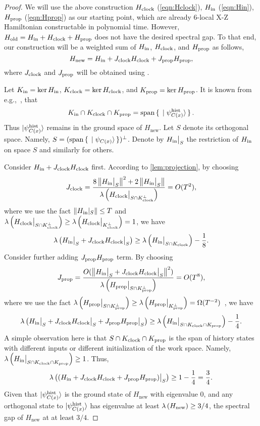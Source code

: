 \begin{proof}
We will use the above construction $H_{\mathrm{clock}}$ (\cref{eqn:Hclock}), $H_{\mathrm{in}}$ (\cref{eqn:Hin}), $H_{\mathrm{prop}}$ (\cref{eqn:Hprop}) as our starting point, which are already 6-local X-Z Hamiltonian constructable in polynomial time. However, $H_{\mathrm{old}}=H_{\mathrm{in}} + H_{\mathrm{clock}} + H_{\mathrm{prop}}$ does not have the desired spectral gap. To that end, our construction will be a weighted sum of $H_{\mathrm{in}}$, $H_{\mathrm{clock}}$, and $H_{\mathrm{prop}}$ as follows, 
\begin{equation}
    H_{\mathrm{new}}= H_{\mathrm{in}} + J_{\mathrm{clock}} H_{\mathrm{clock}} + J_{\mathrm{prop}} H_{\mathrm{prop}},
\end{equation}
where $J_{\mathrm{clock}}$ and $J_{\mathrm{prop}}$ will be obtained using . 

Let $K_{\mathrm{in}}=\ker H_{\mathrm{in}}$, $K_{\mathrm{clock}}=\ker H_{\mathrm{clock}}$, and $K_{\mathrm{prop}}=\ker H_{\mathrm{prop}}$. It is known from e.g.,~\cite{kitaev2002classical}, that 
\[
   K_{\mathrm{in}} \cap K_{\mathrm{clock}} \cap K_{\mathrm{prop}} = \operatorname*{\operatorname{span}}\set{\ket{\psi_{C(x)}^{\mathrm{hist}}}}.
\]
Thus $\ket{\psi_{C(x)}^{\mathrm{hist}}}$ remains in the ground space of $H_{\mathrm{new}}$. Let $S$ denote its orthogonal space. Namely, $S=(\operatorname*{\operatorname{span}}\set{\ket{\psi_{C(x)}}})^\bot$. 
Denote by $H_{\mathrm{in}}\big|_S$ the restriction of $H_{\mathrm{in}}$ on space $S$ and similarly for others. 

Consider $H_{\mathrm{in}} + J_{\mathrm{clock}}H_{\mathrm{clock}}$ first. According to \cref{lem:projection}, by choosing 
\[
  J_{\mathrm{clock}} = \frac{8\left\lVert H_{\mathrm{in}}\big|_S\right\rVert^2 + 2 \left\lVert H_{\mathrm{in}}\big|_S\right\rVert}{{\lambda \left (H_{\mathrm{clock}}\big|_{S\cap K_{\mathrm{clock}}^\bot} \right)}} = O(T^2),
\]
where we use the fact $\left\lVert H_{\mathrm{in}}|_S\right\rVert\leq T$ and ${\lambda \left (H_{\mathrm{clock}}\big|_{S\cap K_{\mathrm{clock}}^\bot} \right)}\geq {\lambda \left (H_{\mathrm{clock}}\big|_{K_{\mathrm{clock}}^\bot} \right)}=1$, 
we have 
\[
 {\lambda \left (H_{\mathrm{in}}\big|_S + J_{\mathrm{clock}}H_{\mathrm{clock}}\big|_S \right)}\geq {\lambda \left (H_{\mathrm{in}}\big|_{S\cap K_{\mathrm{clock}}} \right)} - \frac{1}{8}. 
\]
Consider further adding $J_{\mathrm{prop}}H_{\mathrm{prop}}$ term.  By choosing 
\[
 J_{\mathrm{prop}}= \frac{O(\left\lVert H_{\mathrm{in}}\big|_S + J_{\mathrm{clock}}H_{\mathrm{clock}}\big|_S\right\rVert^2)}{{\lambda \left (H_{\mathrm{prop}}\big|_{S \cap K_{\mathrm{prop}}^\bot} \right)}}= O(T^8),
\]
where we use the fact ${\lambda \left (H_{\mathrm{prop}}\big|_{S\cap K_{\mathrm{prop}}^\bot} \right)}\geq {\lambda \left (H_{\mathrm{prop}}\big|_{K_{\mathrm{prop}}^\bot} \right)}=\Omega(T^{-2})$~\cite{kitaev2002classical}, we have  
\[
 {\lambda \left (H_{\mathrm{in}}\big|_S + J_{\mathrm{clock}}H_{\mathrm{clock}}\big|_S + J_{\mathrm{prop}}H_{\mathrm{prop}}\big|_S \right)} \geq {\lambda \left (H_{\mathrm{in}}\big|_{S \cap K_{\mathrm{clock}}\cap K_{\mathrm{prop}}} \right)} - \frac{1}{4}. 
\]
A simple observation here is that $S \cap K_{\mathrm{clock}} \cap K_{\mathrm{prop}}$ is the span of history states with different inputs or different initialization of the work space. Namely, ${\lambda \left (H_{\mathrm{in}}\big|_{S \cap K_{\mathrm{clock}} \cap K_{\mathrm{prop}}} \right)} \geq 1$. Thus, 
\[
  {\lambda \left ((H_{\mathrm{in}} + J_{\mathrm{clock}}H_{\mathrm{clock}} + J_{\mathrm{prop}}H_{\mathrm{prop}})\big|_S \right)} \geq 1- \frac{1}{4}=\frac{3}{4}. 
\]
Given that $\ket{\psi_{C(x)}^{\mathrm{hist}}}$ is the ground state of $H_{\mathrm{new}}$ with eigenvalue 0, and any orthogonal state to $\ket{\psi_{C(x)}^{\mathrm{hist}}}$ has eigenvalue at least ${\lambda \left (H_{\mathrm{new}} \right)}\geq 3/4$, the spectral gap of $H_{\mathrm{new}}$ at at least $3/4$. 


\end{proof}
